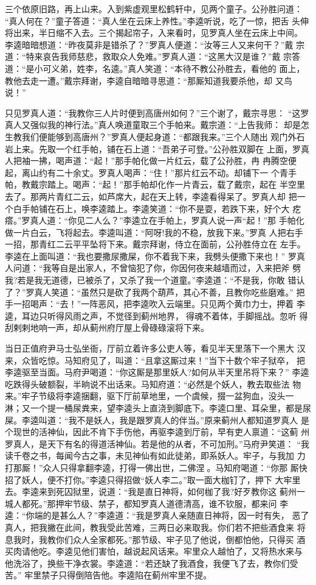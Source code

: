 三个依原旧路，再上山来。入到紫虚观里松鹤轩中，见两个童子。公孙胜问道：
“真人何在？”童子答道：“真人坐在云床上养性。”李逵听说，吃了一惊，把舌
头伸将出来，半日缩不入去。三个揭起帘子，入来看时，见罗真人坐在云床上中间。
李逵暗暗想道：“昨夜莫非是错杀了？”罗真人便道：“汝等三人又来何干？”戴
宗道：“特来哀告我师慈悲，救取众人免难。”罗真人道：“这黑大汉是谁？”戴
宗答道：“是小可义弟，姓李，名逵。”真人笑道：“本待不教公孙胜去，看他的
面上，教他去走一遭。”戴宗拜谢，李逵自暗暗寻思道：“那厮知道我要杀他，却
又鸟说！”

只见罗真人道：“我教你三人片时便到高唐州如何？”三个谢了，戴宗寻思：
“这罗真人又强似我的神行法。”真人唤道童取三个手帕来。戴宗道：“上告我师：
却是怎生教我们便能够到高唐州？”罗真人便起身道：“都跟我来。”三个人随出
观门外石岩上来。先取一个红手帕，铺在石上道：“吾弟子可登。”公孙胜双脚在
上面，罗真人把袖一拂，喝声道：“起！”那手帕化做一片红云，载了公孙胜，冉
冉腾空便起，离山约有二十余丈。罗真人喝声：“住！”那片红云不动。却铺下一
个青手帕，教戴宗踏上。喝声：“起！”那手帕却化作一片青云，载了戴宗，起在
半空里去了。那两片青红二云，如芦席大，起在天上转，李逵看得呆了。罗真人却
把一个白手帕铺在石上，唤李逵踏上。李逵笑道：“你不是耍，若跌下来，好个大
疙瘩。”罗真人道：“你见二人么？”李逵立在手帕上，罗真人说一声“起！”那
手帕化做一片白云，飞将起去。李逵叫道：“阿呀!我的不稳，放我下来。”罗真
人把右手一招，那青红二云平平坠将下来。戴宗拜谢，侍立在面前，公孙胜侍立在
左手。李逵在上面叫道：“我也要撒尿撒屎，你不着我下来，我劈头便撒下来也！”
罗真人问道：“我等自是出家人，不曾恼犯了你，你因何夜来越墙而过，入来把斧
劈我?若是我无道德，已被杀了，又杀了我一个道童。”李逵道：“不是我，你敢
错认了？”罗真人笑道：“虽然只是砍了我两个葫芦，其心不善，且教你吃些磨难。”
把手一招喝声：“去！”一阵恶风，把李逵吹入云端里。只见两个黄巾力士，押着
李逵，耳边只听得风雨之声，不觉径到蓟州地界，得魂不着体，手脚摇战。忽听
得刮剌剌地响一声，却从蓟州府厅屋上骨碌碌滚将下来。

当日正值府尹马士弘坐衙，厅前立着许多公吏人等，看见半天里落下一个黑大
汉来，众皆吃惊。马知府见了，叫道：“且拿这厮过来！”当下十数个牢子狱卒，
把李逵驱至当面。马府尹喝道：“你这厮是那里妖人?如何从半天里吊将下来？”
李逵吃跌得头破额裂，半晌说不出话来。马知府道：“必然是个妖人，教去取些法
物来。”牢子节级将李逵捆翻，驱下厅前草地里，一个虞候，掇一盆狗血，没头一
淋；又一个提一桶尿粪来，望李逵头上直浇到脚底下。李逵口里、耳朵里，都是尿
屎。李逵叫道：“我不是妖人，我是跟罗真人的伴当。”原来蓟州人都知道罗真人
是个现世的活神仙，因此不肯下手伤他，再驱李逵到厅前，早有吏人禀道：“这蓟
州罗真人，是天下有名的得道活神仙。若是他的从者，不可加刑。”马府尹笑道：
“我读千卷之书，每闻今古之事，未见神仙有如此徒弟，即系妖人。牢子，与我加
力打那厮！”众人只得拿翻李逵，打得一佛出世，二佛涅。马知府喝道：“你那
厮快招了妖人，便不打你。”李逵只得招做“妖人李二。”取一面大枷钉了，押下
大牢里去。李逵来到死囚狱里，说道：“我是直日神将，如何枷了我?好歹教你这
蓟州一城人都死。”那押牢节级、禁子，都知罗真人道德清高，谁不钦服，都来问
李逵：“你端的是甚么人？”李逵道：“我是罗真人亲随直日神将，因一时有失，
恶了真人，把我撇在此间，教我受此苦难，三两日必来取我。你们若不把些酒食来
将息我时，我教你们众人全家都死。”那节级、牢子见了他说，倒都怕他，只得买
酒买肉请他吃。李逵见他们害怕，越说起风话来。牢里众人越怕了，又将热水来与
他洗浴了，换些干净衣裳。李逵道：“若还缺了我酒食，我便飞了去，教你们受苦。”
牢里禁子只得倒陪告他。李逵陷在蓟州牢里不提。

